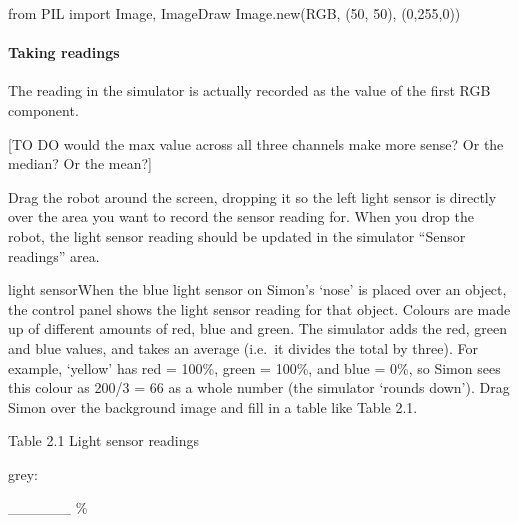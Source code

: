 \documentclass[letterpaper,10pt,english]{sphinxmanual}
\begin{document}
{{
\begin{sphinxVerbatim}[commandchars=\\\{\}]
\llap{\color{nbsphinxin}[ ]:\,\hspace{\fboxrule}\hspace{\fboxsep}}from PIL import Image, ImageDraw
Image.new(\PYGZsq{}RGB\PYGZsq{}, (50, 50), (0,255,0))
\end{sphinxVerbatim}
}


\paragraph{Taking readings}
\label{\detokenize{content/04_Robot_Lab/Section_00_02:Taking-readings}}
The  reading in the simulator is actually recorded as the value of the first RGB component.

{[}TO DO \sphinxhyphen{} would the max value across all three channels make more sense? Or the median? Or the mean?{]}

Drag the robot around the screen, dropping it so the left light sensor is directly over the area you want to record the sensor reading for. When you drop the robot, the light sensor reading should be updated in the simulator “Sensor readings” area.

light sensorWhen the blue light sensor on Simon’s ‘nose’ is placed over an object, the control panel shows the light sensor reading for that object. Colours are made up of different amounts of red, blue and green. The simulator adds the red, green and blue values, and takes an average (i.e. it divides the total by three). For example, ‘yellow’ has red = 100\%, green = 100\%, and blue = 0\%, so Simon sees this colour as 200/3 = 66 as a whole number (the simulator ‘rounds down’). Drag Simon over the
background image and fill in a table like Table 2.1.





Table 2.1 Light sensor readings









grey:





\_\_\_\_\_\_ \%









}
\end{document}
